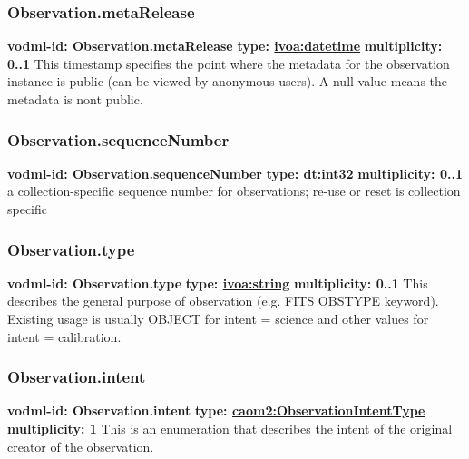     \subsubsection{Observation.metaRelease}
      \textbf{vodml-id: Observation.metaRelease} \newline
      \textbf{type: \hyperref[sect:ivoa]{ivoa:datetime}} \newline
      \textbf{multiplicity: 0..1} \newline
      This timestamp specifies the point where the metadata for the observation instance is public (can be viewed by anonymous users). A null value means the metadata is nont public.

    \subsubsection{Observation.sequenceNumber}
      \textbf{vodml-id: Observation.sequenceNumber} \newline
      \textbf{type: dt:int32} \newline
      \textbf{multiplicity: 0..1} \newline
      a collection-specific sequence number for observations; re-use or reset is collection specific

    \subsubsection{Observation.type}
      \textbf{vodml-id: Observation.type} \newline
      \textbf{type: \hyperref[sect:ivoa]{ivoa:string}} \newline
      \textbf{multiplicity: 0..1} \newline
      This describes the general purpose of observation (e.g. FITS OBSTYPE keyword). Existing usage is usually OBJECT for intent = science and other values for intent = calibration.

    \subsubsection{Observation.intent}
      \textbf{vodml-id: Observation.intent} \newline
      \textbf{type: \hyperref[sect:ObservationIntentType]{caom2:ObservationIntentType}} \newline
      \textbf{multiplicity: 1} \newline
      This is an enumeration that describes the intent of the original creator of the observation.


